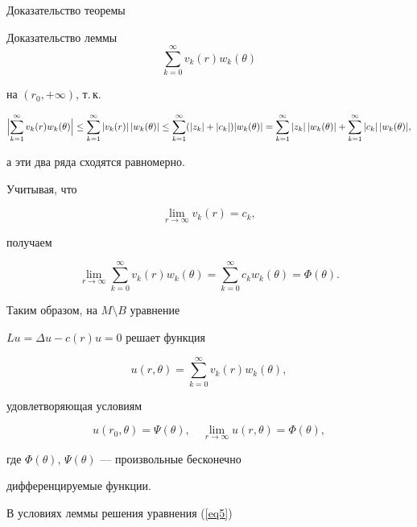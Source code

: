 \begin{pf*}{Доказательство теоремы}
\begin{pf*}{Доказательство леммы}
$$


\sum_{k=0}^{\infty}v_k(r)w_k(\theta)


$$


на $(r_0,+\infty)$, т.\,к.


$$


\Bigl|\sum_{k=1}^\infty v_k(r)w_k(\theta)\Bigr|\le


\sum_{k=1}^\infty |v_k(r)|\,|w_k(\theta)|\le


\sum_{k=1}^\infty (|z_k|+|c_k|)|w_k(\theta)|=


\sum_{k=1}^\infty


|z_k|\,|w_k(\theta)|+\sum_{k=1}^\infty |c_k|\,|w_k(\theta)|,


$$


а эти два ряда сходятся равномерно.





Учитывая, что


$$


\lim_{r\to\infty}v_k(r)=c_k,


$$


получаем


$$


\lim_{r\to\infty}\sum_{k=0}^\infty v_k(r)w_k(\theta)=\sum_{k=0}^\infty


c_kw_k(\theta)=\Phi(\theta).


$$





Таким образом, на $M\setminus B$ уравнение


$Lu=\Delta u-c(r)u=0$ решает функция


$$


u(r,\theta)=\sum\limits_{k=0}^\infty v_k(r)w_k(\theta),


$$


удовлетворяющая условиям


$$


u(r_0,\theta)=\Psi(\theta),\quad


\lim_{r\to\infty}u(r,\theta)=\Phi(\theta),


$$


где $\Phi(\theta)$, $\Psi(\theta)$ --- произвольные бесконечно


дифференцируемые функции.


\end{pf*}





\begin{note} В условиях леммы решения уравнения (\ref{eq5})



\end{note}
\end{pf*}

